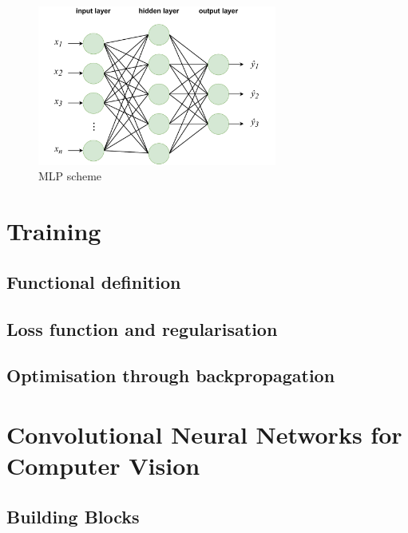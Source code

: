 \begin{figure}[htbp]
  \centering
  \includegraphics[width=0.7\textwidth]{chapter_dlo/assets/mlp_scheme.pdf}
  \caption{\ac{MLP} scheme}
  \label{fig:dlo:mlp}
\end{figure}

\section{Training}\label{sec:dlo:training}


\subsection{Functional definition}
\subsection{Loss function and regularisation}


\subsection{Optimisation through backpropagation}

\section{Convolutional Neural Networks for Computer Vision}\label{sec:dlo:cnn}
\subsection{Building Blocks}
